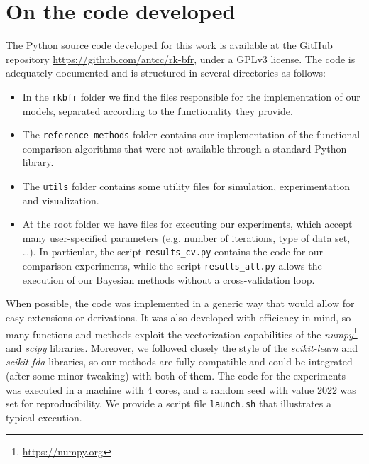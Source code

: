 %
%

\chapter{On the code developed}\label{ch:code}

The Python source code developed for this work is available at the GitHub repository \url{https://github.com/antcc/rk-bfr}, under a GPLv3 license. The code is adequately documented and is structured in several directories as follows:

\begin{itemize}
  \item In the \texttt{rkbfr} folder we find the files responsible for the implementation of our models, separated according to the functionality they provide.
  \item The \texttt{reference\_methods} folder contains our implementation of the functional comparison algorithms that were not available through a standard Python library.
  \item The \texttt{utils} folder contains some utility files for simulation, experimentation and visualization.
  \item At the root folder we have files for executing our experiments, which accept many user-specified parameters (e.g. number of iterations, type of data set, \ldots). In particular, the script \texttt{results\_cv.py} contains the code for our comparison experiments, while the script \texttt{results\_all.py} allows the execution of our Bayesian methods without a cross-validation loop.
\end{itemize}

When possible, the code was implemented in a generic way that would allow for easy extensions or derivations. It was also developed with efficiency in mind, so many functions and methods exploit the vectorization capabilities of the \textit{numpy}\footnote{\url{https://numpy.org}} and \textit{scipy} libraries. Moreover, we followed closely the style of the \textit{scikit-learn} and \textit{scikit-fda} libraries, so our methods are fully compatible and could be integrated (after some minor tweaking) with both of them. The code for the experiments was executed in a machine with 4 cores, and a random seed with value 2022 was set for reproducibility. We provide a script file \texttt{launch.sh} that illustrates a typical execution.

